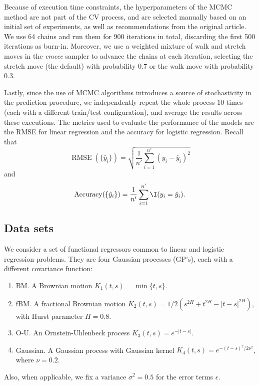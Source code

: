 Because of execution time constraints, the hyperparameters of the MCMC method are not part of the CV process, and are selected manually based on an initial set of experiments, as well as recommendations from the original article. We use 64 chains and run them for 900 iterations in total, discarding the first 500 iterations as burn-in. Moreover, we use a weighted mixture of walk and stretch moves in the \textit{emcee} sampler to advance the chains at each iteration, selecting the stretch move (the default) with probability 0.7 or the walk move with probability 0.3.

Lastly, since the use of MCMC algorithms introduces a source of stochasticity in the prediction procedure, we independently repeat the whole process 10 times (each with a different train/test configuration), and average the results across these executions. The metrics used to evaluate the performance of the models are the RMSE for linear regression and the accuracy for logistic regression. Recall that
\[
\operatorname{RMSE}(\{\hat y_i\}) = \sqrt{\frac{1}{n'}\sum_{i=1}^{n'} (y_i - \hat y_i)^2}
\]
and
\[
\operatorname{Accuracy}(\{\hat y_i\}) = \frac{1}{n'} \sum_{i=1}^{n'} \I(y_i = \hat y_i).
\]

\subsection*{Data sets}

We consider a set of functional regressors common to linear and logistic regression problems. They are four Gaussian processes (GP's), each with a different covariance function:
\begin{enumerate}
  \item BM.\hspace{0.3em} A Brownian motion \(K_1(t,s)=\min\{t,s\}\).
  \item fBM.\hspace{0.3em} A fractional Brownian motion \(K_2(t,s)=1/2(s^{2H} + t^{2H} - |t-s|^{2H})\), with Hurst parameter \(H=0.8\).
  \item O-U.\hspace{0.3em} An Ornstein-Uhlenbeck process \(K_3(t,s)=e^{-|t-s|}\).
  \item Gaussian.\hspace{0.3em} A Gaussian process with Gaussian kernel \(K_4(t,s)=e^{-(t-s)^2/2\nu^2}\), where \(\nu=0.2\).
\end{enumerate}
Also, when applicable, we fix a variance \(\sigma^2=0.5\) for the error terms \(\epsilon\).

